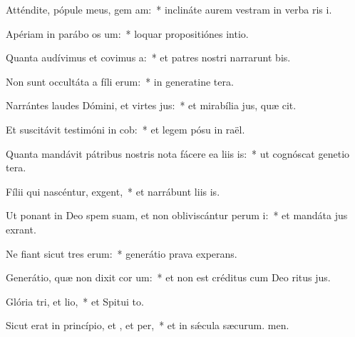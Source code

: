 \item Atténdite, pópule meus, gem am:~* inclináte aurem vestram in verba ris i.
\item Apériam in parábo os um:~* loquar propositiónes  intio.
\item Quanta audívimus et covimus a:~* et patres nostri narrarunt bis.
\item Non sunt occultáta a fíli erum:~* in generatine tera.
\item Narrántes laudes Dómini, et virtes jus:~* et mirabília jus, quæ cit.
\item Et suscitávit testimóni in cob:~* et legem pósu in raël.
\item Quanta mandávit pátribus nostris nota fácere ea liis is:~* ut cognóscat genetio tera.
\item Fílii qui nascéntur,  exgent,~* et narrábunt liis is.
\item Ut ponant in Deo spem suam, et non obliviscántur perum i:~* et mandáta jus exrant.
\item Ne fiant sicut tres erum:~* generátio prava  experans.
\item Generátio, quæ non dixit cor um:~* et non est créditus cum Deo ritus jus.
\item Glória tri, et lio,~* et Spitui to.
\item Sicut erat in princípio, et , et per,~* et in sǽcula sæcurum. men.
